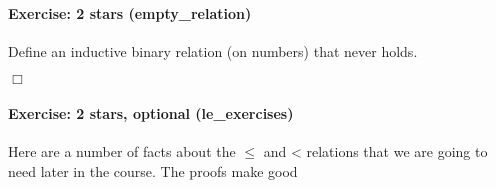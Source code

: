 \documentclass[12pt]{report}
\begin{document}
\paragraph{Exercise: 2 stars (empty\_relation)}

 Define an inductive binary relation  (on numbers)
    that never holds. \begin{coqdoccode}
\coqdocemptyline
\end{coqdoccode}
\ensuremath{\Box} 

\paragraph{Exercise: 2 stars, optional (le\_exercises)}

 Here are a number of facts about the \ensuremath{\le} and < relations that
    we are going to need later in the course.  The proofs make good
\end{document}
